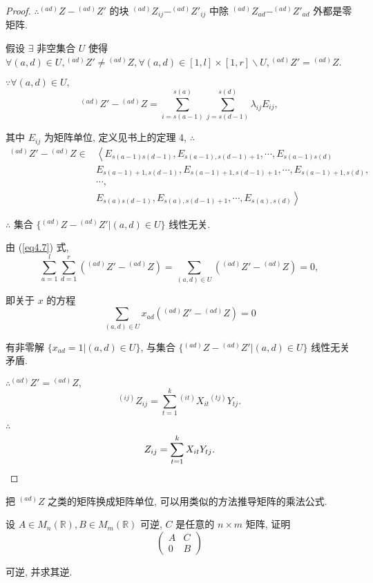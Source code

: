 \documentclass{ctexart}
\begin{document}
\begin{proof}
    $\therefore{}^{(ad)}Z-{}^{(ad)}Z'$ 的块 $^{(ad)}Z_{ij}-^{(ad)}Z'_{ij}$ 中除 $^{(ad)}Z_{ad}-^{(ad)}Z'_{ad}$ 外都是零矩阵.

    假设 $\exists$ 非空集合 $U$ 使得 $\forall (a,d)\in U,{}^{(ad)}Z'\neq{}^{(ad)}Z,\forall (a,d)\in[1,l]\times[1,r]\backslash U,{}^{(ad)}Z'={}^{(ad)}Z$.

    $\because\forall (a,d)\in U,$
    \[{}^{(ad)}Z'-{}^{(ad)}Z=\sum\limits_{i=s(a-1)}^{s(a)}\sum\limits_{j=s(d-1)}^{s(d)}\lambda_{ij}E_{ij},\]

    其中 $E_{ij}$ 为矩阵单位, 定义见书上的定理 4, $\therefore$
    \begin{align*}
        {}^{(ad)}Z'-{}^{(ad)}Z\in & \left<E_{s(a-1)s(d-1)},E_{s(a-1),s(d-1)+1},\cdots,E_{s(a-1)s(d)}\right. \\
        & E_{s(a-1)+1,s(d-1)},E_{s(a-1)+1,s(d-1)+1},\cdots,E_{s(a-1)+1,s(d)}, \\
        & \cdots, \\
        & \left.E_{s(a)s(d-1)},E_{s(a),s(d-1)+1},\cdots,E_{s(a),s(d)}\right>
    \end{align*}
    
    $\therefore$ 集合 $\{{}^{(ad)}Z-{}^{(ad)}Z'|(a,d)\in U\}$ 线性无关.

    由 (\ref{eq4.7}) 式,
    \[\sum\limits_{a=1}^{l}\sum\limits_{d=1}^{r}({}^{(ad)}Z'-{}^{(ad)}Z)=\sum\limits_{(a,d)\in U}({}^{(ad)}Z'-{}^{(ad)}Z)=0,\]

    即关于 $x$ 的方程
    \[\sum\limits_{(a,d)\in U}x_{ad}({}^{(ad)}Z'-{}^{(ad)}Z)=0\]

    有非零解 $\{x_{ad}=1|(a,d)\in U\}$, 与集合 $\{{}^{(ad)}Z-{}^{(ad)}Z'|(a,d)\in U\}$ 线性无关矛盾.

    $\therefore{}^{(ad)}Z'={}^{(ad)}Z,$
    \[^{(ij)}Z_{ij}=\sum\limits_{t=1}^k{}^{(it)}X_{it}{}^{(tj)}Y_{tj}.\]

    $\therefore$
    \[Z_{ij}=\sum\limits_{t=1}^kX_{it}Y_{tj}.\qedhere\]
\end{proof}
\begin{note}
    把 $^{(ad)}Z$ 之类的矩阵换成矩阵单位, 可以用类似的方法推导矩阵的乘法公式.
\end{note}
\begin{exercisec}[第 4 章的习题 3.9]
    设 $A\in M_n(\mathbb{R}),B\in M_m(\mathbb{R})$ 可逆, $C$ 是任意的 $n\times m$ 矩阵, 证明
    \[\begin{pmatrix}
        A & C \\
        0 & B
    \end{pmatrix}\]

    可逆, 并求其逆.
\end{exercisec}
\end{document}
